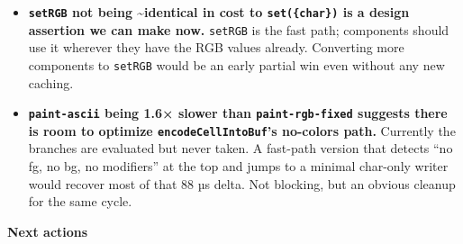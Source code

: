 \begin{itemize}
\tightlist
\item
  \textbf{\texttt{s\allowbreak{}e\allowbreak{}t\allowbreak{}R\allowbreak{}G\allowbreak{}B} not being \textasciitilde identical in cost to \texttt{s\allowbreak{}e\allowbreak{}t\allowbreak{}(\allowbreak{}\{\allowbreak{}c\allowbreak{}h\allowbreak{}a\allowbreak{}r\allowbreak{}\}\allowbreak{})} is a design assertion we can make now.} \texttt{s\allowbreak{}e\allowbreak{}t\allowbreak{}R\allowbreak{}G\allowbreak{}B} is the fast path; components should use it wherever they have the RGB values already. Converting more components to \texttt{s\allowbreak{}e\allowbreak{}t\allowbreak{}R\allowbreak{}G\allowbreak{}B} would be an early partial win even without any new caching.
\item
  \textbf{\texttt{p\allowbreak{}a\allowbreak{}i\allowbreak{}n\allowbreak{}t\allowbreak{}-\allowbreak{}a\allowbreak{}s\allowbreak{}c\allowbreak{}i\allowbreak{}i} being 1.6× slower than \texttt{p\allowbreak{}a\allowbreak{}i\allowbreak{}n\allowbreak{}t\allowbreak{}-\allowbreak{}r\allowbreak{}g\allowbreak{}b\allowbreak{}-\allowbreak{}f\allowbreak{}i\allowbreak{}x\allowbreak{}e\allowbreak{}d} suggests there is room to optimize \texttt{e\allowbreak{}n\allowbreak{}c\allowbreak{}o\allowbreak{}d\allowbreak{}e\allowbreak{}C\allowbreak{}e\allowbreak{}l\allowbreak{}l\allowbreak{}I\allowbreak{}n\allowbreak{}t\allowbreak{}o\allowbreak{}B\allowbreak{}u\allowbreak{}f}'s no-colors path.} Currently the branches are evaluated but never taken. A fast-path version that detects ``no fg, no bg, no modifiers'' at the top and jumps to a minimal char-only writer would recover most of that 88 µs delta. Not blocking, but an obvious cleanup for the same cycle.
\end{itemize}

\textbf{Next actions}

